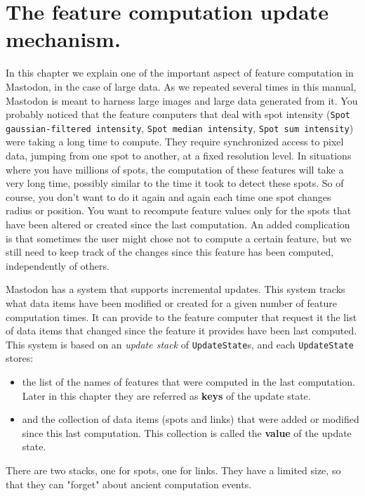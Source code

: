 \section{The feature computation update mechanism.}
\label{FeatureComputationUpdateMechanism}

In this chapter we explain one of the important aspect of feature computation in Mastodon, in the case of large data.
As we repeated several times in this manual, Mastodon is meant to harness large images and large data generated from it. 
You probably noticed that the feature computers that deal with spot intensity (\texttt{Spot gaussian-filtered intensity}, \texttt{Spot median intensity}, \texttt{Spot sum intensity}) were taking a long time to compute. 
They require synchronized access to pixel data, jumping from one spot to another, at a fixed resolution level.
In situations where you have millions of spots, the computation of these features will take a very long time, possibly similar to the time it took to detect these spots. 
So of course, you don't want to do it again and again each time one spot changes radius or position.
You want to recompute feature values only for the spots that have been altered or created since the last computation. 
An added complication is that sometimes the user might chose not to compute a certain feature, but we still need to keep track of the changes since this feature has been computed, independently of others.

Mastodon has a system that supports incremental updates. 
This system tracks what data items have been modified or created for a given number of feature computation times. 
It can provide to the feature computer that request it the list of data items that changed since the feature it provides have been last computed.
This system is based on an \textit{update stack} of \texttt{UpdateState}s, and each \texttt{UpdateState} stores:
\begin{itemize}
    \item the list of the names of features that were computed in the last computation. 
    Later in this chapter they are referred as \textbf{keys} of the update state.
    \item and the collection of data items (spots and links) that were added or modified since this last computation. This collection is called the \textbf{value} of the update state.
\end{itemize}
\noindent There are two stacks, one for spots, one for links.
They have a limited size, so that they can "forget" about ancient computation events. 

